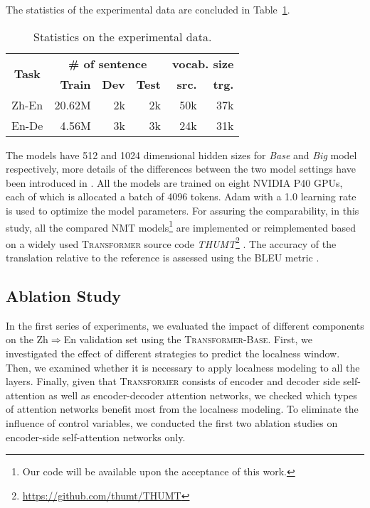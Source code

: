 \documentclass[11pt,a4paper]{article}
\begin{document}
The statistics of the experimental data are concluded in Table~\ref{tab:statistic}.
\begin{table}[ht]
	\begin{center}
		\begin{tabular}{c||r|r|r|r|r}
		    \multirow{2}{*}{\textbf{Task}}  & \multicolumn{3}{c|}{\textbf{\# of sentence}}                                     &  \multicolumn{2}{c}{\textbf{vocab. size}} \\ \cline{2-6}
				& \textbf{Train}   & 	\textbf{Dev}  & 	\textbf{Test} & \textbf{src.} & \textbf{trg.}  \\ \hline \hline
			Zh-En	  & 20.62M     	   &  2k & 2k &  50k & 37k   \\ 
			En-De    &  4.56M       &  3k  &  3k  & 24k & 31k \\ 
		\end{tabular}
		\caption{Statistics on the experimental data.}
		\label{tab:statistic} 
	\end{center}
\end{table}

The models have 512 and 1024 dimensional hidden sizes for \emph{Base} and \emph{Big} model respectively, more details of the differences between the two model settings have been introduced in . All the models are trained on eight NVIDIA P40 GPUs, each of which is allocated a batch of 4096 tokens. 
Adam \cite{kingma2014adam} with a 1.0 learning rate is used to optimize the model parameters.  For assuring the comparability, in this study, all the compared NMT models\footnote{Our code will be available upon the acceptance of this work.} are implemented or reimplemented based on a widely used \textsc{Transformer} source code \emph{THUMT}\footnote{\url{https://github.com/thumt/THUMT}} \cite{zhang2017thumt}. The accuracy of the translation relative to the reference is assessed using the BLEU metric \cite{papineni2002bleu}.
\fi


\subsection{Ablation Study}
\label{sec:ablation}

In the first series of experiments, we evaluated the impact of different components on the Zh$\Rightarrow$En validation set using the \textsc{Transformer-Base}.
First, we investigated the effect of different strategies to predict the localness window.
Then, we examined whether it is necessary to apply localness modeling to all the layers.
Finally, given that \textsc{Transformer} consists of encoder and decoder side self-attention as well as encoder-decoder attention networks, we checked which types of attention networks benefit most from the localness modeling.
To eliminate the influence of control variables, we conducted the first two ablation studies on encoder-side self-attention networks only. 
\end{document}
